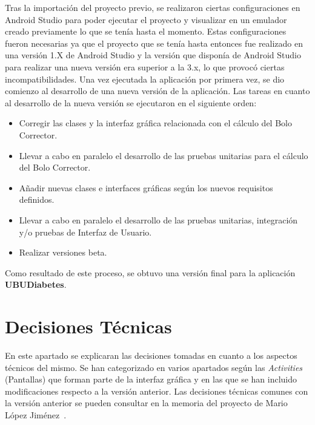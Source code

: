 Tras la importación del proyecto previo, se realizaron ciertas configuraciones en Android Studio para poder ejecutar el proyecto y visualizar en un emulador creado previamente lo que se tenía hasta el momento. Estas configuraciones fueron necesarias ya que el proyecto que se tenía hasta entonces fue realizado en una versión 1.X de Android Studio y la versión que disponía de Android Studio para realizar una nueva versión era superior a la 3.x, lo que provocó ciertas incompatibilidades.
Una vez ejecutada la aplicación por primera vez, se dio comienzo al desarrollo de una nueva versión de la aplicación. Las tareas en cuanto al desarrollo de la nueva versión se ejecutaron en el siguiente orden:
\begin{itemize}
	\item Corregir las clases y la interfaz gráfica relacionada con el cálculo del Bolo Corrector.
	\item Llevar a cabo en paralelo el desarrollo de las pruebas unitarias para el cálculo del Bolo Corrector.
	\item Añadir nuevas clases e interfaces gráficas según los nuevos requisitos definidos.
	\item Llevar a cabo en paralelo el desarrollo de las pruebas unitarias, integración y/o pruebas de Interfaz de Usuario.
	\item Realizar versiones beta.
\end{itemize}
Como resultado de este proceso, se obtuvo una versión final para la aplicación \textbf{UBUDiabetes}.

\section{Decisiones Técnicas}
En este apartado se explicaran las decisiones tomadas en cuanto a los aspectos técnicos del mismo.
Se han categorizado en varios apartados según las \textit{Activities} (Pantallas) que forman parte de la interfaz gráfica y en las que se han incluido modificaciones respecto a la versión anterior.
Las decisiones técnicas comunes con la versión anterior se pueden consultar en la memoria del proyecto de Mario López Jiménez~\cite{mario2016}.
